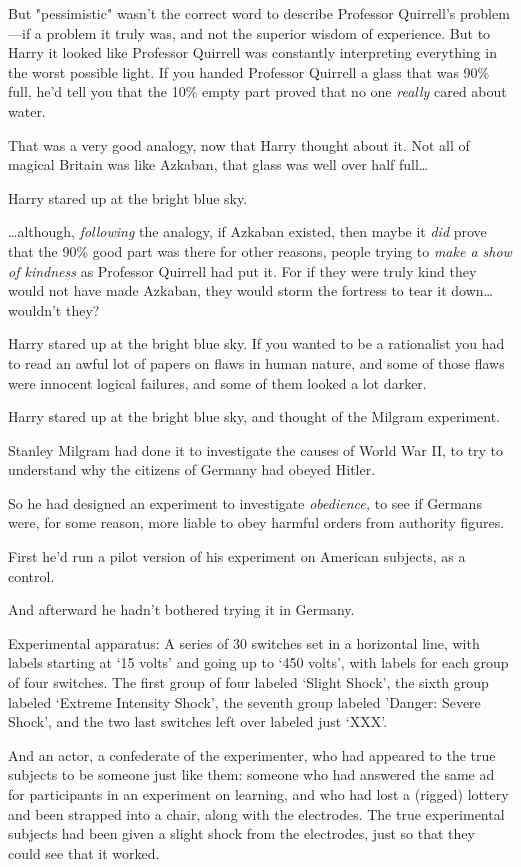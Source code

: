 But "pessimistic" wasn't the correct word to describe Professor Quirrell's 
problem---if a problem it truly was, and not the superior wisdom of experience. 
But to Harry it looked like Professor Quirrell was constantly interpreting 
everything in the worst possible light. If you handed Professor Quirrell a 
glass that was 90\% full, he'd tell you that the 10\% empty part proved that no 
one \emph{really} cared about water.

That was a very good analogy, now that Harry thought about it. Not all of 
magical Britain was like Azkaban, that glass was well over half full{\ldots}

Harry stared up at the bright blue sky.

{\ldots}although, \emph{following} the analogy, if Azkaban existed, then maybe 
it \emph{did} prove that the 90\% good part was there for other reasons, people 
trying to \emph{make a show of kindness} as Professor Quirrell had put it. For 
if they were truly kind they would not have made Azkaban, they would storm the 
fortress to tear it down{\ldots} wouldn't they?

Harry stared up at the bright blue sky. If you wanted to be a rationalist you 
had to read an awful lot of papers on flaws in human nature, and some of those 
flaws were innocent logical failures, and some of them looked a lot darker.

Harry stared up at the bright blue sky, and thought of the Milgram experiment.

Stanley Milgram had done it to investigate the causes of World War II, to try 
to understand why the citizens of Germany had obeyed Hitler.

So he had designed an experiment to investigate \emph{obedience,} to see if 
Germans were, for some reason, more liable to obey harmful orders from 
authority figures.

First he'd run a pilot version of his experiment on American subjects, as a 
control.

And afterward he hadn't bothered trying it in Germany.

Experimental apparatus: A series of 30 switches set in a horizontal line, with 
labels starting at `15 volts' and going up to `450 volts', with labels for each 
group of four switches. The first group of four labeled `Slight Shock', the 
sixth group labeled `Extreme Intensity Shock', the seventh group labeled 
'Danger: Severe Shock', and the two last switches left over labeled just `XXX'.

And an actor, a confederate of the experimenter, who had appeared to the true 
subjects to be someone just like them: someone who had answered the same ad for 
participants in an experiment on learning, and who had lost a (rigged) lottery 
and been strapped into a chair, along with the electrodes. The true 
experimental subjects had been given a slight shock from the electrodes, just 
so that they could see that it worked.

